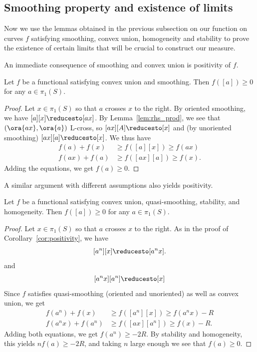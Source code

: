 \subsection{Smoothing property and existence of limits}
\label{subsec:smoothing}
Now we use the lemmas obtained in the previous subsection on our function on curves $f$ satisfying smoothing, convex union, homogeneity and stability to prove the existence of certain limits that will be crucial to construct our measure.

An immediate consequence of smoothing and convex union is positivity of $f$.

\begin{corollary}
  Let $f$ be a functional satisfying convex union and smoothing. Then $f([a]) \geq 0$ for any $a \in \pi_1(S)$.
  \label{cor:positivity}
\end{corollary}
\begin{proof}
Let $x \in \pi_1(S)$ so that $a$ crosses $x$ to the right. By oriented
smoothing, we have
$[a][x] \reducesto [ax]$.
By Lemma~\ref{lem:rhs_prod}, we see that
$(\ora{ax},\ora{a})$ L-cross, so
$[ax][A]\reducesto [x]$ and (by unoriented smoothing) $[ax][a]
\reducesto [x]$. We thus have
\begin{align*}
    f(a) + f(x) &\geq f([a] [x]) \geq f(ax)\\
     f(ax) + f(a) &\geq f([ax] [a]) \geq f(x).
\end{align*}
Adding the equations, we get $f(a) \geq 0$.
\end{proof}

A similar argument with different assumptions also yields positivity.

\begin{corollary}
  Let $f$ be a functional satisfying convex union, quasi-smoothing,
  stability, and homogeneity. Then $f([a]) \geq 0$ for any $a \in
  \pi_1(S)$.
  \label{cor:positivity2}
\end{corollary}

\begin{proof}
Let $x \in \pi_1(S)$ so that $a$ crosses $x$ to the right. As in the proof of Corollary~\ref{cor:positivity}, we have
\[
[a^n][x] \reducesto [a^nx].
\]
and
\[
[a^nx][a^n]\reducesto [x]
\]
Since $f$ satisfies quasi-smoothing (oriented and unoriented) as well as convex union, we get
\begin{align*}
    f(a^n) + f(x) &\geq f([a^n] [x]) \geq f(a^nx) - R\\
     f(a^nx) + f(a^n) &\geq f([ax] [a^n]) \geq f(x) - R.
\end{align*}
Adding both equations, we get $f(a^n) \geq -2R$. By stability and homogeneity, this yields $n f(a) \geq -2R$, and taking $n$ large enough we see that $f(a) \geq 0$.
\end{proof}


